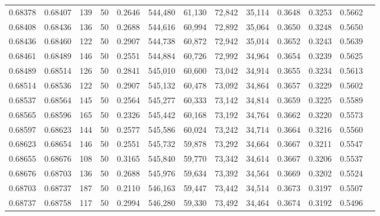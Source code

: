 \begin{tabular}{rrrrrrrrrrrrr}
0.68378 & 0.68407 &   139 &  50 &                                     0.2646 & 544,480 &  61,130 &  72,842 &  35,114 & 0.3648 & 0.3253 & 0.5662 \\
0.68408 & 0.68436 &   136 &  50 &                                     0.2688 & 544,616 &  60,994 &  72,892 &  35,064 & 0.3650 & 0.3248 & 0.5650 \\
0.68436 & 0.68460 &   122 &  50 &                                     0.2907 & 544,738 &  60,872 &  72,942 &  35,014 & 0.3652 & 0.3243 & 0.5639 \\
0.68461 & 0.68489 &   146 &  50 &                                     0.2551 & 544,884 &  60,726 &  72,992 &  34,964 & 0.3654 & 0.3239 & 0.5625 \\
0.68489 & 0.68514 &   126 &  50 &                                     0.2841 & 545,010 &  60,600 &  73,042 &  34,914 & 0.3655 & 0.3234 & 0.5613 \\
0.68514 & 0.68536 &   122 &  50 &                                     0.2907 & 545,132 &  60,478 &  73,092 &  34,864 & 0.3657 & 0.3229 & 0.5602 \\
0.68537 & 0.68564 &   145 &  50 &                                     0.2564 & 545,277 &  60,333 &  73,142 &  34,814 & 0.3659 & 0.3225 & 0.5589 \\
0.68565 & 0.68596 &   165 &  50 &                                     0.2326 & 545,442 &  60,168 &  73,192 &  34,764 & 0.3662 & 0.3220 & 0.5573 \\
0.68597 & 0.68623 &   144 &  50 &                                     0.2577 & 545,586 &  60,024 &  73,242 &  34,714 & 0.3664 & 0.3216 & 0.5560 \\
0.68623 & 0.68654 &   146 &  50 &                                     0.2551 & 545,732 &  59,878 &  73,292 &  34,664 & 0.3667 & 0.3211 & 0.5547 \\
0.68655 & 0.68676 &   108 &  50 &                                     0.3165 & 545,840 &  59,770 &  73,342 &  34,614 & 0.3667 & 0.3206 & 0.5537 \\
0.68676 & 0.68703 &   136 &  50 &                                     0.2688 & 545,976 &  59,634 &  73,392 &  34,564 & 0.3669 & 0.3202 & 0.5524 \\
0.68703 & 0.68737 &   187 &  50 &                                     0.2110 & 546,163 &  59,447 &  73,442 &  34,514 & 0.3673 & 0.3197 & 0.5507 \\
0.68737 & 0.68758 &   117 &  50 &                                     0.2994 & 546,280 &  59,330 &  73,492 &  34,464 & 0.3674 & 0.3192 & 0.5496 \\

\end{tabular}
